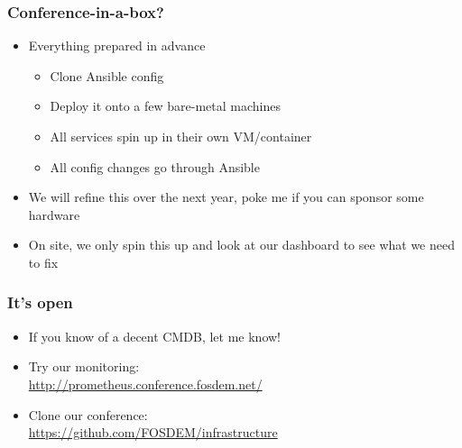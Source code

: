 \documentclass[t]{beamer}
\begin{document}
\begin{frame}
	\frametitle{Conference-in-a-box?}
	\vfill
	\begin{itemize}
		\item Everything prepared in advance
		\begin{itemize}
			\item Clone Ansible config
			\item Deploy it onto a few bare-metal machines
			\item All services spin up in their own VM/container
			\item All config changes go through Ansible
		\end{itemize}
		\item We will refine this over the next year, poke me if you can sponsor some hardware
		\item On site, we only spin this up and look at our dashboard to see what we need to fix
	\end{itemize}
	\vfill
\end{frame}

\begin{frame}
	\frametitle{It's open}
	\vfill
	\begin{itemize}
		\item If you know of a decent CMDB, let me know!
		\item Try our monitoring: \\ \url{http://prometheus.conference.fosdem.net/}
		\item Clone our conference: \\ \url{https://github.com/FOSDEM/infrastructure}
	\end{itemize}
	\vfill
\end{frame}
\end{document}
